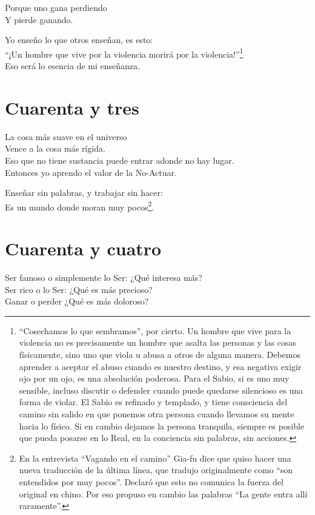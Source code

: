 \documentclass[book,b5paper,hidelinks,final]{memoir}
\begin{document}
	Porque uno gana perdiendo\\
	Y pierde ganando.
	
	Yo enseño lo que otros enseñan, es esto:\\
	``¡Un hombre que vive por la violencia morirá por la violencia!''\footnote{``Cosechamos lo que sembramos'', por cierto. Un hombre que vive para la
		violencia no es precisamente un hombre que asalta las personas y las
		cosas físicamente, sino uno que viola u abusa a otros de alguna manera.
		Debemos aprender a aceptar el abuso cuando es nuestro destino, y esa
		negativa exigir ojo por un ojo, es una absolución poderosa. Para el
		Sabio, si es uno muy sensible, incluso discutir o defender cuando puede
		quedarse silencioso es una forma de violar. El Sabio es refinado y
		templado, y tiene consciencia del camino sin salido en que ponemos otra
		persona cuando llevamos su mente hacia lo físico. Si en cambio dejamos
		la persona tranquila, siempre es posible que pueda posarse en lo Real,
		en la conciencia sin palabras, sin acciones.}\\
	Eso será lo esencia de mi enseñanza.
	
	\chapter*{Cuarenta y tres}
	
	La cosa más suave en el universo\\
	Vence a la cosa más rígida.\\
	Eso que no tiene sustancia puede entrar adonde no hay lugar.\\
	Entonces yo aprendo el valor de la No-Actuar.
	
	Enseñar sin palabras, y trabajar sin hacer:\\
	Es un mundo donde moran muy pocos\footnote{En la entrevista ``Vagando en el camino'' Gia-fu dice que quiso hacer
		una nueva traducción de la última línea, que tradujo originalmente como
		``son entendidos por muy pocos''. Declaró que esto no comunica la fuerza
		del original en chino. Por eso propuso en cambio las palabras ``La gente
		entra allí raramente''.}.
	
	\chapter*{Cuarenta y cuatro}
	
	Ser famoso o simplemente lo Ser: ¿Qué interesa más?\\
	Ser rico o lo Ser: ¿Qué es más precioso?\\
	Ganar o perder ¿Qué es más doloroso?
	
\end{document}
